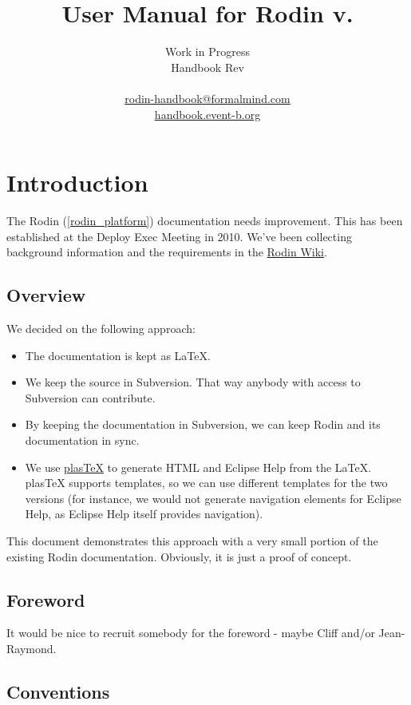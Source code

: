 \documentclass{book}
\title{User Manual for Rodin v.\versionnr}
\author{
Work in Progress\\
Handbook $ $Rev$ $ \\
\\
\href{mailto:rodin-handbook@formalmind.com}{rodin-handbook@formalmind.com}\\
\href{http://handbook.event-b.org}{handbook.event-b.org}
}
\begin{document}
        

\maketitle

\ifplastex
\else
\tableofcontents
\fi

\chapter{Introduction}

The Rodin (\ref{rodin_platform}) documentation needs improvement.  This has been established at the Deploy Exec Meeting in 2010.  We've been collecting background information and the requirements in the \href{http://wiki.event-b.org/index.php/User_Documentation_Overhaul}{Rodin Wiki}.

\section{Overview}

We decided on the following approach:

\begin{itemize}
\item The documentation is kept as \LaTeX.
\item We keep the source in Subversion.  That way anybody with access to Subversion can contribute.
\item By keeping the documentation in Subversion, we can keep Rodin and its documentation in sync.
\item We use \href{http://plastex.sourceforge.net/}{plasTeX} to generate HTML and Eclipse Help from the \LaTeX.  plasTeX supports templates, so we can use different templates for the two versions (for instance, we would not generate navigation elements for Eclipse Help, as Eclipse Help itself provides navigation).
\end{itemize}

This document demonstrates this approach with a very small portion of the existing Rodin documentation.  Obviously, it is just a proof of concept.

\section{Foreword}

It would be nice to recruit somebody for the foreword - maybe Cliff and/or Jean-Raymond.

\section{Conventions}
\label{conventions}
\end{document}
